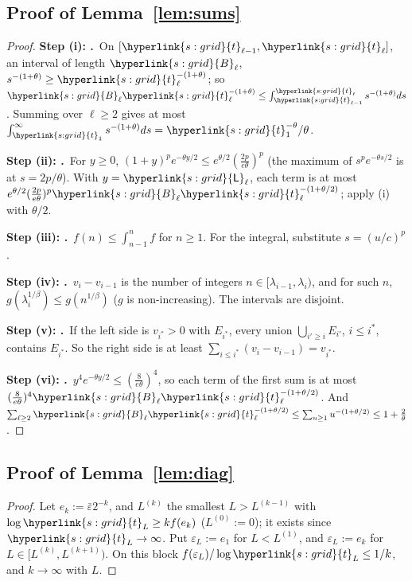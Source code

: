 \documentclass[10pt]{article}
\newcommand{\sy}[2]{{\hyperlink{#1}{#2}}}
\newcommand{\1}{\mathbf{1}}
\newcommand{\tl}{\sy{s:grid}{t}}
\newcommand{\Lg}{\sy{s:grid}{\mathsf L}}
\newcommand{\Bg}{\sy{s:grid}{B}}
\newcommand{\stp}[2]{\par\medskip\noindent\textbf{Step #1: #2.}\ }
\begin{document}
\subsection{Proof of Lemma~\ref{lem:sums}}\label{sec:pf-lem:sums}
\begin{proof}
\stp{(i)}{}On $[\tl_{\ell-1},\tl_\ell]$, an interval of length $\Bg_\ell$, $s^{-(1+\theta)}\ge\tl_\ell^{-(1+\theta)}$; so $\Bg_\ell\tl_\ell^{-(1+\theta)}\le\int_{\tl_{\ell-1}}^{\tl_\ell}s^{-(1+\theta)}ds$.
Summing over $\ell\ge2$ gives at most $\int_{\tl_1}^\infty s^{-(1+\theta)}ds=\tl_1^{-\theta}/\theta$.

\stp{(ii)}{}For $y\ge0$, $(1+y)^pe^{-\theta y/2}\le e^{\theta/2}(\frac{2p}{e\theta})^p$ (the maximum of $s^pe^{-\theta s/2}$ is at $s=2p/\theta$). With $y=\Lg_\ell$, each term is at
most $e^{\theta/2}(\frac{2p}{e\theta})^p\Bg_\ell\tl_\ell^{-(1+\theta/2)}$; apply (i) with $\theta/2$.

\stp{(iii)}{}$f(n)\le\int_{n-1}^nf$ for $n\ge1$. For the integral, substitute $s=(u/c)^p$.

\stp{(iv)}{}$v_i-v_{i-1}$ is the number of integers $n\in[\lambda_{i-1},\lambda_i)$, and for such $n$, $g(\lambda_i^{1/\beta})\le g(n^{1/\beta})$ ($g$ is non-increasing). The intervals are
disjoint.

\stp{(v)}{}If the left side is $v_{i^\ast}>0$ with $E_{i^\ast}$, every union $\bigcup_{i'\ge i}E_{i'}$, $i\le i^\ast$, contains $E_{i^\ast}$. So the right side is at least
$\sum_{i\le i^\ast}(v_i-v_{i-1})=v_{i^\ast}$.

\stp{(vi)}{}$y^4e^{-\theta y/2}\le(\frac8{e\theta})^4$, so each term of the first sum is at most $(\frac8{e\theta})^4\Bg_\ell\tl_\ell^{-(1+\theta/2)}$. And
$\sum_{\ell\ge2}\Bg_\ell\tl_\ell^{-(1+\theta/2)}\le\sum_{u\ge1}u^{-(1+\theta/2)}\le1+\frac2\theta$.
\end{proof}

\subsection{Proof of Lemma~\ref{lem:diag}}\label{sec:pf-lem:diag}
\begin{proof}
Let $e_k:=\bar\varepsilon2^{-k}$, and $L^{(k)}$ the smallest $L>L^{(k-1)}$ with $\log\tl_L\ge kf(e_k)$ ($L^{(0)}:=0$); it exists since $\tl_L\to\infty$. Put $\varepsilon_L:=e_1$ for
$L<L^{(1)}$, and $\varepsilon_L:=e_k$ for $L\in[L^{(k)},L^{(k+1)})$. On this block $f(\varepsilon_L)/\log\tl_L\le1/k$, and $k\to\infty$ with $L$.
\end{proof}
\end{document}
